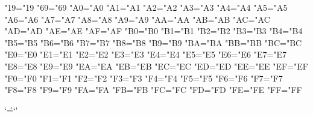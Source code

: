 \lccode"19="19 %
\lccode"69="69 %
\lccode"A0="A0 %
\lccode"A1="A1 %
\lccode"A2="A2 %
\lccode"A3="A3 %
\lccode"A4="A4 %
\lccode"A5="A5 %
\lccode"A6="A6 %
\lccode"A7="A7 %
\lccode"A8="A8 %
\lccode"A9="A9 %
\lccode"AA="AA %
\lccode"AB="AB %
\lccode"AC="AC %
\lccode"AD="AD %
\lccode"AE="AE %
\lccode"AF="AF %
\lccode"B0="B0 %
\lccode"B1="B1 %
\lccode"B2="B2 %
\lccode"B3="B3 %
\lccode"B4="B4 %
\lccode"B5="B5 %
\lccode"B6="B6 %
\lccode"B7="B7 %
\lccode"B8="B8 %
\lccode"B9="B9 %
\lccode"BA="BA %
\lccode"BB="BB %
\lccode"BC="BC %
\lccode"E0="E0 %
\lccode"E1="E1 %
\lccode"E2="E2 %
\lccode"E3="E3 %
\lccode"E4="E4 %
\lccode"E5="E5 %
\lccode"E6="E6 %
\lccode"E7="E7 %
\lccode"E8="E8 %
\lccode"E9="E9 %
\lccode"EA="EA %
\lccode"EB="EB %
\lccode"EC="EC %
\lccode"ED="ED %
\lccode"EE="EE %
\lccode"EF="EF %
\lccode"F0="F0 %
\lccode"F1="F1 %
\lccode"F2="F2 %
\lccode"F3="F3 %
\lccode"F4="F4 %
\lccode"F5="F5 %
\lccode"F6="F6 %
\lccode"F7="F7 %
\lccode"F8="F8 %
\lccode"F9="F9 %
\lccode"FA="FA %
\lccode"FB="FB %
\lccode"FC="FC %
\lccode"FD="FD %
\lccode"FE="FE %
\lccode"FF="FF %

\lccode`\'=`\'
